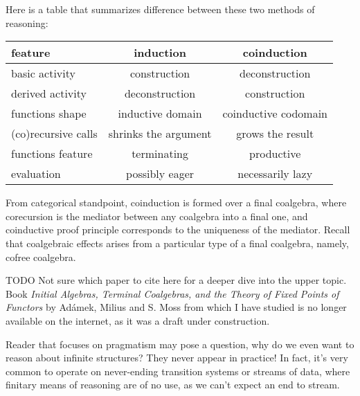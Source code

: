 \documentclass[declaration,shortabstract]{iithesis}
\theoremstyle{definition} \newtheorem{definition}{Definition}[chapter]
\theoremstyle{remark} \newtheorem{remark}[definition]{Observation}
\theoremstyle{plain} \newtheorem{theorem}[definition]{Theorem}
\theoremstyle{plain} \newtheorem{lemma}[definition]{Lemma}
\begin{document}
    Here is a table that summarizes difference between these two methods of reasoning:

    \begin{center}
    \begin{tabular}{lcc}
    \toprule

    \textbf{feature}             & \textbf{induction}            & \textbf{coinduction}          \\
    \midrule

    basic activity      & construction          & deconstruction \\
    \midrule

    derived activity    & deconstruction       & construction         \\
    \midrule

    functions shape     & inductive domain     & coinductive codomain \\
    \midrule

    (co)recursive calls& shrinks the argument & grows the result     \\
    \midrule

    functions feature   & terminating          & productive           \\
    \midrule

    evaluation          & possibly eager       & necessarily lazy     \\
    \bottomrule

    \end{tabular}
    \end{center}

    From categorical standpoint, coinduction is formed over a final coalgebra,
    where corecursion is the mediator between any coalgebra into a final one,
    and coinductive proof principle corresponds to the uniqueness of the mediator.
    Recall that coalgebraic effects arises from a particular type of a final
    coalgebra, namely, cofree coalgebra.

    \noindent
    TODO Not sure which paper to cite here for a deeper dive into the upper
    topic. Book \textit{Initial Algebras, Terminal Coalgebras, and the Theory of Fixed Points of Functors}
    by Adámek, Milius and S. Moss from which I have studied is no longer available
    on the internet, as it was a draft under construction.

    Reader that focuses on pragmatism may pose a question, why do we even want
    to reason about infinite structures? They never appear in practice! In fact,
    it's very common to operate on never-ending transition systems or streams of
    data, where finitary means of reasoning are of no use, as we can’t expect
    an end to stream.
\end{document}
